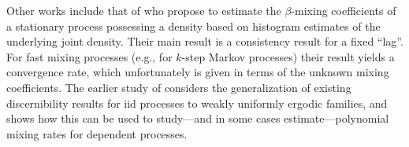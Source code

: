 Other works include that of \citet{McDoShaSche11} who propose to estimate
the $\beta$-mixing coefficients of a stationary process possessing a density
based on histogram estimates of the underlying joint density. Their main
result is a consistency result for a fixed ``lag''. For fast mixing processes
(e.g., for $k$-step Markov processes) their result yields a convergence rate,
which unfortunately is given in terms of the unknown mixing coefficients.
The earlier study of \citet{Nobel06} considers the generalization of
existing discernibility results for iid processes to weakly uniformly
ergodic families, and shows how this can be used to study---and in
some cases estimate---polynomial mixing rates for dependent processes.


